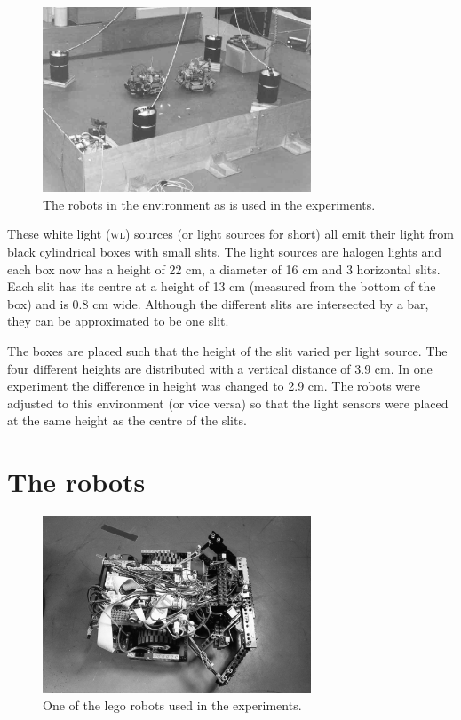 \begin{figure}[t]
\centerline{\includegraphics[width=8cm]{robots//environment.eps}}
\caption{The robots in the environment as is used in the experiments.}
\label{f:robots:envir}
\end{figure}


These white light {\scshape (wl)} sources (or light sources for short) all emit their light from black cylindrical boxes with  small slits. The light sources are halogen lights and each box now has a height of 22 cm, a diameter of 16 cm and 3 horizontal slits. Each slit has its centre at a height of 13 cm (measured from the bottom of the box) and is 0.8 cm wide. Although the different slits are intersected by a bar, they can be approximated to be one slit.

The boxes are placed such that the height of the slit varied per light source. The four different heights are distributed with a vertical distance of 3.9 cm. In one experiment the difference in height was changed to 2.9 cm. The robots were adjusted to this environment (or vice versa) so that the light sensors were placed at the same height as the centre of the slits.

\section{The robots}\label{s:robots:robots}

\begin{figure}[t]
\centerline{\includegraphics[width=8cm]{robots//robot.eps}}
\caption{One of the {\sc lego} robots used in the experiments.}
\label{f:robots}
\end{figure}

